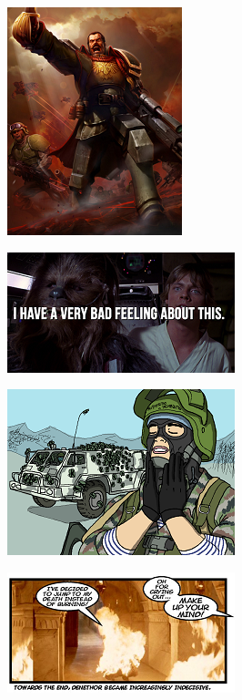 \begin{figure}
	\begin{center}
		\includegraphics[width=\figwidth]{pics/6/38.png}
	\end{center}
\end{figure}

\begin{figure}
	\begin{center}
		\includegraphics[width=\figwidth]{pics/6/39.png}
	\end{center}
\end{figure}

\begin{figure}
	\begin{center}
		\includegraphics[width=\figwidth]{pics/6/40.png}
	\end{center}
\end{figure}

\begin{figure}
	\begin{center}
		\includegraphics[width=\figwidth]{pics/6/41.png}
	\end{center}
\end{figure}

